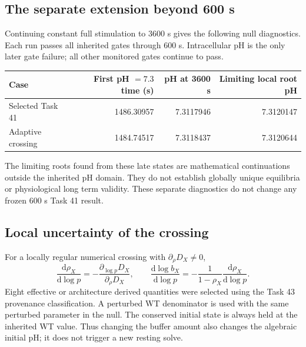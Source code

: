 \subsection{The separate extension beyond 600 s}
Continuing constant full stimulation to 3600 s gives the following null
diagnostics. Each run passes all inherited gates through 600 s. Intracellular
pH is the only later gate failure; all other monitored gates continue to pass.
\begin{center}
\begin{tabular}{lrrr}
\hline
Case & First pH $=7.3$ time (s) & pH at 3600 s & Limiting local root pH \\
\hline
Selected Task 41 & 1486.30957 & 7.3117946 & 7.3120147 \\
Adaptive crossing & 1484.74517 & 7.3118437 & 7.3120644 \\
\hline
\end{tabular}
\end{center}
The limiting roots found from these late states are mathematical continuations
outside the inherited pH domain. They do not establish globally unique
equilibria or physiological long term validity. These separate diagnostics do
not change any frozen 600 s Task 41 result.

\subsection{Local uncertainty of the crossing}
For a locally regular numerical crossing with $\partial_\rho D_X\ne0$,
\begin{equation}
 \frac{\mathrm d\rho_X}{\mathrm d\log p}
 =-\frac{\partial_{\log p}D_X}{\partial_\rho D_X},\qquad
 \frac{\mathrm d\log b_X}{\mathrm d\log p}
 =-\frac{1}{1-\rho_X}\frac{\mathrm d\rho_X}{\mathrm d\log p}.
 \label{m44eq:thresholdsensitivity}
\end{equation}
Eight effective or architecture derived quantities were selected using the
Task 43 provenance classification. A perturbed WT denominator is used with
the same perturbed parameter in the null. The conserved initial state is
always held at the inherited WT value. Thus changing the buffer amount also
changes the algebraic initial pH; it does not trigger a new resting solve.


